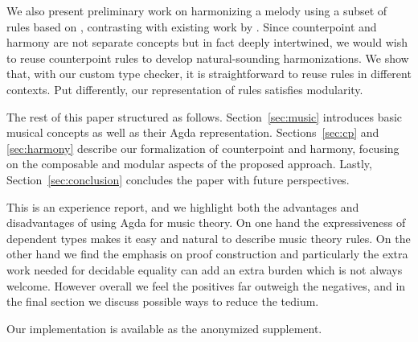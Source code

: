 
We also present preliminary work on harmonizing a melody using
a subset of rules based on \citet{piston-harmony}, contrasting with
existing work by \citet{koops-fharm}. Since counterpoint and
harmony are not separate concepts but in fact deeply intertwined, we
would wish to reuse counterpoint rules to develop natural-sounding
harmonizations.  We show that, with our custom type checker, it is
straightforward to reuse rules in different contexts.  Put differently,
our representation of rules satisfies modularity.

The rest of this paper structured as follows.  Section~\ref{sec:music}
introduces basic musical concepts as well as their Agda representation.
Sections~\ref{sec:cp} and \ref{sec:harmony} describe our formalization
of counterpoint and harmony, focusing on the composable and
modular aspects of the proposed approach.  Lastly,
Section~\ref{sec:conclusion} concludes the paper with future perspectives.

This is an experience report, and we highlight both the advantages and
disadvantages of using Agda for music theory. On one hand the
expressiveness of dependent types makes it easy and natural to
describe music theory rules. On the other hand we find the emphasis on proof
construction and particularly the extra work needed for decidable
equality can add an extra burden which is not always welcome. However
overall we feel the positives far outweigh the negatives, and in the
final section we discuss possible ways to reduce the tedium.

Our implementation is available as the anonymized supplement.